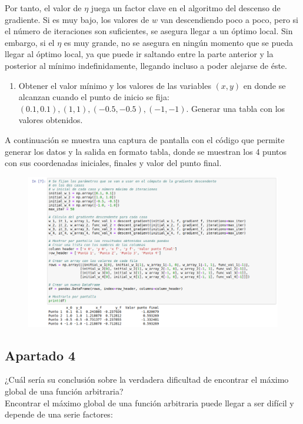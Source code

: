 \documentclass[11pt,a4paper]{article}
\begin{document}
Por tanto, el valor de $\eta$ juega un factor clave en el algoritmo del descenso de gradiente. Si es muy bajo, los valores
de $w$ van descendiendo poco a poco, pero si el número de iteraciones son suficientes, se asegura llegar a un óptimo local.
Sin embargo, si el $\eta$ es muy grande, no se asegura en ningún momento que se pueda llegar al óptimo local, ya que puede
ir saltando entre la parte anterior y la posterior al mínimo indefinidamente, llegando incluso a poder alejarse de éste.

\begin{enumerate}[resume, label=\alph*)]
	\item Obtener el valor mínimo y los valores de las variables $(x, y)$ en donde se alcanzan cuando el punto de inicio
	se fija: $(0.1, 0.1), (1, 1), (-0.5, -0.5), (-1, -1)$. Generar una tabla con los valores obtenidos.
\end{enumerate}

A continuación se muestra una captura de pantalla con el código que permite generar los datos y la salida en formato tabla,
donde se muestran los 4 puntos con sus coordenadas iniciales, finales y valor del punto final.

\begin{figure}[H]
\centering
\includegraphics[scale=0.4]{img/jbook_ej_3_b.png}
\end{figure}

\subsection*{Apartado 4}
\noindent ¿Cuál sería su conclusión sobre la verdadera dificultad de encontrar el máximo global de una función arbitraria?\\

Encontrar el máximo global de una función arbitraria puede llegar a ser difícil y depende de una serie factores:
\end{document}
